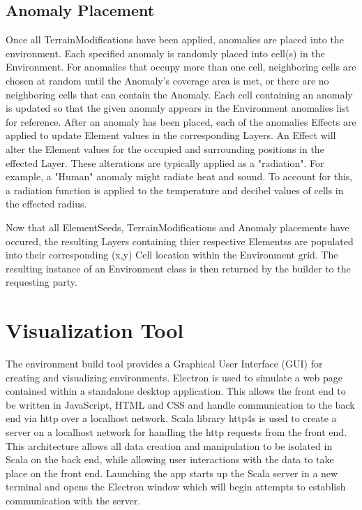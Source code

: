 \subsection{Anomaly Placement}
Once all TerrainModifications have been applied, anomalies are placed into the environment.
Each specified anomaly is randomly placed into cell(s) in the Environment.
For anomalies that occupy more than one cell, neighboring cells are chosen at random until the Anomaly's coverage area is met, or there are no neighboring cells that can contain the Anomaly.
Each cell containing an anomaly is updated so that the given anomaly appears in the Environment anomalies list for reference.
After an anomaly has been placed, each of the anomalies Effects are applied to update Element values in the corresponding Layers.
An Effect will alter the Element values for the occupied and surrounding positions in the effected Layer.
These alterations are typically applied as a "radiation".
For example, a "Human" anomaly might radiate heat and sound.
To account for this, a radiation function  is applied to the temperature and decibel values of cells in the effected radius.

Now that all ElementSeeds, TerrainModifications and Anomaly placements have occured, the resulting Layers containing thier respective Elementss are populated into their corresponding (x,y) Cell location within the Environment grid.
The resulting instance of an Environment class is then returned by the builder to the requesting party.



\section{Visualization Tool}
The environment build tool provides a Graphical User Interface (GUI) for creating and visualizing environments.
Electron  is used to simulate a web page contained within a standalone desktop application.
This allows the front end to be written in JavaScript, HTML and CSS and handle communication to the back end via http over a localhost network.
Scala library http4s  is used to create a server on a localhost network for handling the http requests from the front end.
This architecture allows all data creation and manipulation to be isolated in Scala on the back end, while allowing user interactions with the data to take place on the front end.
Launching the app starts up the Scala server in a new terminal and opens the Electron window which will begin attempts to establish communication with the server.


